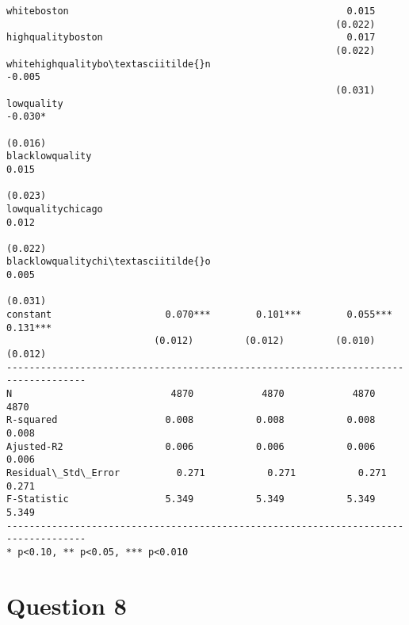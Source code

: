 \documentclass[11pt,notitlepage]{article}\usepackage[]{graphicx}\usepackage[]{color}
\makeatletter
\newenvironment{kframe}{%
 \def\at@end@of@kframe{}%
 \ifinner\ifhmode%
  \def\at@end@of@kframe{\end{minipage}}%
  \begin{minipage}{\columnwidth}%
 \fi\fi%
 \def\FrameCommand##1{\hskip\@totalleftmargin \hskip-\fboxsep
 \colorbox{shadecolor}{##1}\hskip-\fboxsep
     \hskip-\linewidth \hskip-\@totalleftmargin \hskip\columnwidth}%
 \MakeFramed {\advance\hsize-\width
   \@totalleftmargin\z@ \linewidth\hsize
   \@setminipage}}%
 {\par\unskip\endMakeFramed%
 \at@end@of@kframe}
\newenvironment{knitrout}{}{} %
\makeatother
\begin{document}
\begin{enumerate}[a)]
\begin{knitrout}
\begin{kframe}
\begin{footnotesize}
\begin{Verbatim}[commandchars=\\\{\}]
whiteboston                                                 0.015                   
                                                          (0.022)                   
highqualityboston                                           0.017                   
                                                          (0.022)                   
whitehighqualitybo\textasciitilde{}n                                       -0.005                   
                                                          (0.031)                   
lowquality                                                                 -0.030*  
                                                                          (0.016)   
blacklowquality                                                             0.015   
                                                                          (0.023)   
lowqualitychicago                                                           0.012   
                                                                          (0.022)   
blacklowqualitychi\textasciitilde{}o                                                        0.005   
                                                                          (0.031)   
constant                    0.070***        0.101***        0.055***        0.131***
                          (0.012)         (0.012)         (0.010)         (0.012)   
------------------------------------------------------------------------------------
N                            4870            4870            4870            4870   
R-squared                   0.008           0.008           0.008           0.008   
Ajusted-R2                  0.006           0.006           0.006           0.006   
Residual\_Std\_Error          0.271           0.271           0.271           0.271   
F-Statistic                 5.349           5.349           5.349           5.349   
------------------------------------------------------------------------------------
* p<0.10, ** p<0.05, *** p<0.010

    \end{Verbatim}
\end{footnotesize}

\end{kframe}
\end{knitrout}
\end{enumerate}

\section*{Question 8}
\begin{knitrout}
\color{fgcolor}\begin{kframe}
\begin{verbatim}






\end{verbatim}
\end{kframe}
\end{knitrout}
\end{document}
